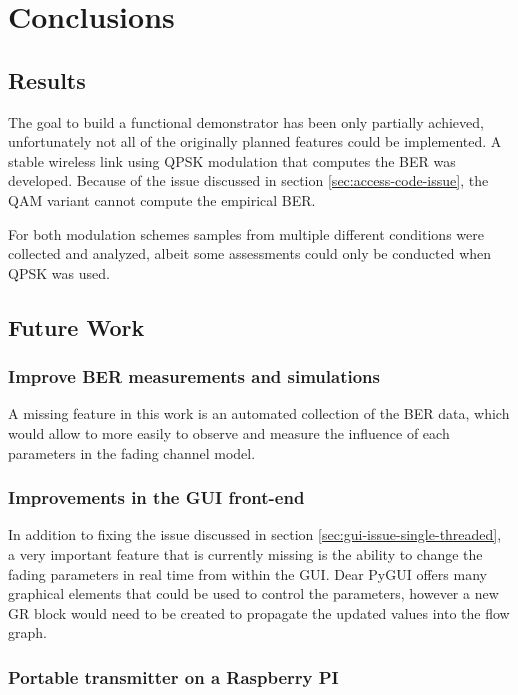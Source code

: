 
\chapter{Conclusions} \label{chp:conclusions}

\section{Results}

The goal to build a functional demonstrator has been only partially achieved, unfortunately not all of the originally planned features could be implemented. A stable wireless link using QPSK modulation that computes the BER was developed. Because of the issue discussed in section \ref{sec:access-code-issue}, the QAM variant cannot compute the empirical BER.

For both modulation schemes samples from multiple different conditions were collected and analyzed, albeit some assessments could only be conducted when QPSK was used.

\section{Future Work}

\subsection{Improve BER measurements and simulations}

A missing feature in this work is an automated collection of the BER data, which would allow to more easily to observe and measure the influence of each parameters in the fading channel model.

\subsection{Improvements in the GUI front-end}

In addition to fixing the issue discussed in section \ref{sec:gui-issue-single-threaded}, a very important feature that is currently missing is the ability to change the fading parameters in real time from within the GUI. Dear PyGUI offers many graphical elements that could be used to control the parameters, however a new GR block would need to be created to propagate the updated values into the flow graph.

\subsection{Portable transmitter on a Raspberry PI}



